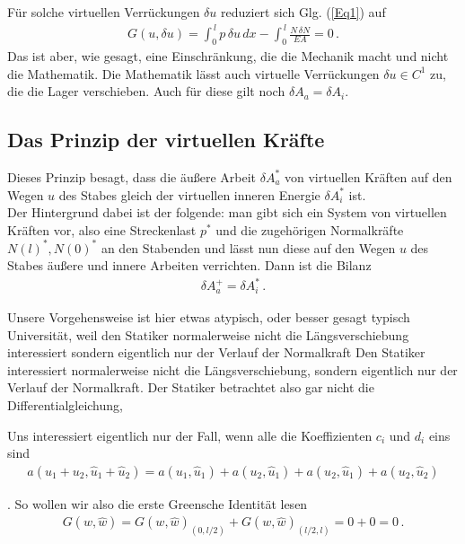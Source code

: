 F\"{u}r solche virtuellen Verr\"{u}ckungen $ \delta u $ reduziert sich Glg. (\ref{Eq1}) auf
\begin{align}
G(u,\delta u) = \int_0^{\,l} p\,\delta u\,dx  - \int_0^{\,l} \frac{N\,\delta N}{EA}= 0\,.
\end{align}
Das ist aber, wie gesagt, eine Einschr\"{a}nkung, die die Mechanik macht und nicht die Mathematik. Die Mathematik l\"{a}sst auch virtuelle Verr\"{u}ckungen $\delta u \in C^1$ zu, die die Lager verschieben. Auch f\"{u}r diese gilt noch $\delta A_a = \delta A_i$. \\

\subsection{Das Prinzip der virtuellen Kr\"{a}fte}
Dieses Prinzip besagt, dass die \"{a}u{\ss}ere Arbeit $\delta A_a^*$ von virtuellen Kr\"{a}ften auf den Wegen $ u $ des Stabes gleich der virtuellen inneren Energie $\delta A_i^*$ ist.\\

Der Hintergrund dabei ist der folgende: man gibt sich ein System von virtuellen Kr\"{a}ften vor, also eine Streckenlast $ p^* $ und die zugeh\"{o}rigen Normalkr\"{a}fte $ N(l)^*, N(0)^*$ an den Stabenden
und l\"{a}sst nun diese auf den Wegen $ u $ des Stabes \"{a}u{\ss}ere und innere Arbeiten verrichten. Dann ist die Bilanz
\begin{align}
\delta A_a^+ = \delta A_i^*\,.
\end{align}

 Unsere Vorgehensweise ist hier etwas atypisch, oder besser gesagt typisch Universit\"{a}t, weil den Statiker normalerweise nicht die L\"{a}ngsverschiebung interessiert sondern eigentlich nur der Verlauf der Normalkraft
 Den Statiker interessiert normalerweise nicht die L\"{a}ngsverschiebung, sondern eigentlich nur der Verlauf der Normalkraft. Der Statiker betrachtet also gar nicht die Differentialgleichung,

Uns interessiert eigentlich nur der Fall, wenn alle die Koeffizienten $c_i$ und $d_i$ eins sind
\begin{align}
a(u_1 + u_2,\hat{u}_1 + \hat{u}_2) = a(u_1,\hat{u}_1) + a(u_2,\hat{u}_1) + a(u_2,\hat{u}_1) + a(u_2,\hat{u}_2)
\end{align}

. So wollen wir also die erste Greensche Identit\"{a}t lesen
\begin{align}
G(w,\hat{w}) = G(w,\hat{w})_{(0,l/2) }+ G(w,\hat{w})_{(l/2,l)} = 0 + 0 = 0\,.
\end{align}


